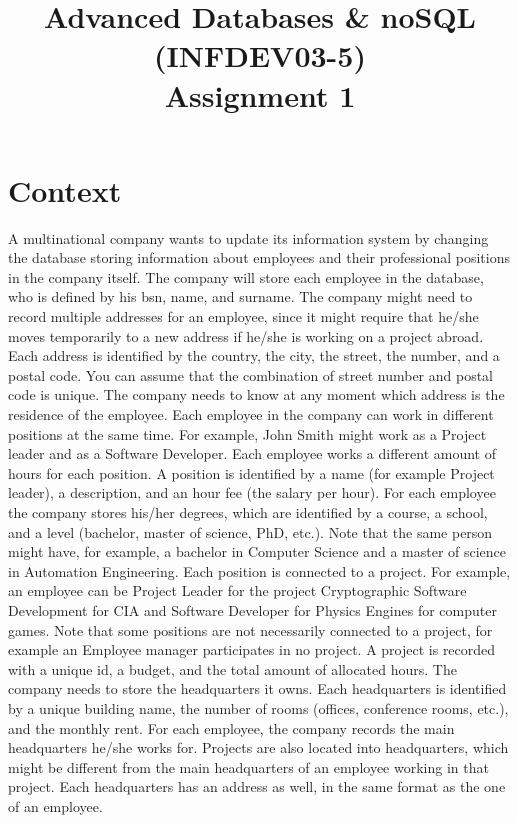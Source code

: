 \documentclass[10pt,a4paper]{article}
\title{Advanced Databases \& noSQL (INFDEV03-5) \\ Assignment 1}
\author { }
\date { }
\begin{document}
\maketitle

\section*{Context}
A multinational company wants to update its information system by changing the database storing information about employees and their professional positions in the company itself. 
The company will store each employee in the database, who is defined by his bsn, name, and surname. 
The company might need to record multiple addresses for an employee, since it might require that he/she moves temporarily to a new address if he/she is working on a project abroad. Each address is identified by the country, the city, the street, the number, and a postal code. You can assume that the combination of street number and postal code is unique. The company needs to know at any moment which address is the residence of the employee.
Each employee in the company can work in different positions at the same time. For example, John Smith might work as a Project leader and as a Software Developer. Each employee works a different amount of hours for each position. A position is identified by a name (for example Project leader), a description, and an hour fee (the salary per hour).
For each employee the company stores his/her degrees, which are identified by a course, a school, and a level (bachelor, master of science, PhD, etc.). Note that the same person might have, for example, a bachelor in Computer Science and a master of science in Automation Engineering.
Each position is connected to a project. For example, an employee can be Project Leader for the project Cryptographic Software Development for CIA and Software Developer for Physics Engines for computer games. Note that some positions are not necessarily connected to a project, for example an Employee manager participates in no project. A project is recorded with a unique id, a budget, and the total amount of allocated hours.
The company needs to store the headquarters it owns. Each headquarters is identified by a unique building name, the number of rooms (offices, conference rooms, etc.), and the monthly rent. For each employee, the company records the main headquarters he/she works for. Projects are also located into headquarters, which might be different from the main headquarters of an employee working in that project. Each headquarters has an address as well, in the same format as the one of an employee.
\end{document}
